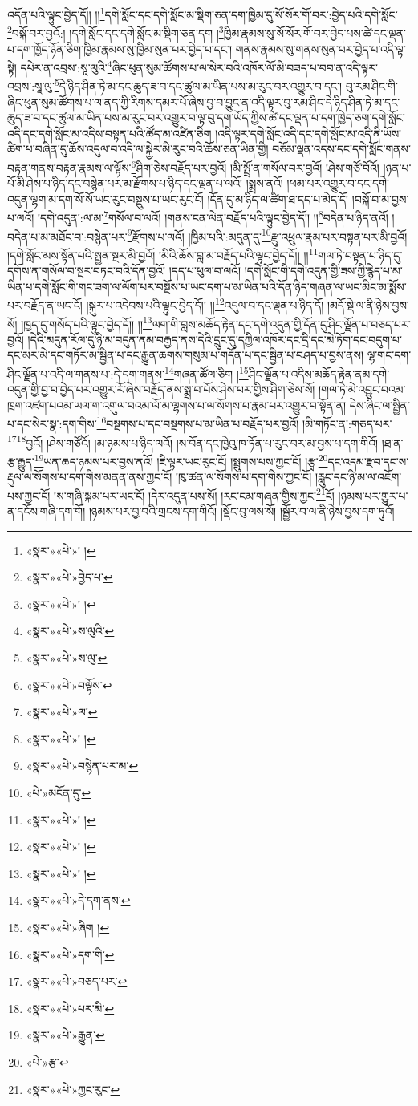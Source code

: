 འདོན་པའི་ལྟུང་བྱེད་དོ།། །།\footnote{«སྣར་»«པེ་»། །}དགེ་སློང་དང་དགེ་སློང་མ་སྡིག་ཅན་དག་ཁྱིམ་དུ་སོ་སོར་གོ་བར་:བྱེད་པའི་དགེ་སློང་\footnote{«སྣར་»«པེ་»བྱེད་པ་}བསྐོ་བར་བྱའོ:། །དགེ་སློང་དང་དགེ་སློང་མ་སྡིག་ཅན་དག །\footnote{«སྣར་»«པེ་»། །}ཁྱིམ་རྣམས་སུ་སོ་སོར་གོ་བར་བྱེད་པས་ཚེ་དང་ལྡན་པ་དག་ཁྱོད་ཉོན་ཅིག་ཁྱིམ་རྣམས་སུ་ཁྱིམ་སུན་པར་བྱེད་པ་དང་། གནས་རྣམས་སུ་གནས་སུན་པར་བྱེད་པ་འདི་ལྟ་སྟེ། དཔེར་ན་འབྲས་:སཱ་ལུའི་\footnote{«སྣར་»«པེ་»ས་ལུའི་}ཞིང་ཕུན་སུམ་ཚོགས་པ་ལ་སེར་བའི་འཁོར་ལོ་མི་བཟད་པ་བབ་ན་འདི་ལྟར་འབྲས་:སཱ་ལུ་\footnote{«སྣར་»«པེ་»ས་ལུ་}དེ་ཉིད་ཤིན་ཏེ་མ་དང་ཆུད་ཟ་བ་དང་ཚུལ་མ་ཡིན་པས་མ་རུང་བར་འགྱུར་བ་དང་། བུ་རམ་ཤིང་གི་ཞིང་ཕུན་སུམ་ཚོགས་པ་ལ་ནད་ཀྱི་རིགས་དམར་པོ་ཞེས་བྱ་བ་བྱུང་ན་འདི་ལྟར་བུ་རམ་ཤིང་དེ་ཉིད་ཤིན་ཏེ་མ་དང་ཆུད་ཟ་བ་དང་ཚུལ་མ་ཡིན་པས་མ་རུང་བར་འགྱུར་བ་ལྟ་བུ་དག་ཡོད་ཀྱིས་ཚེ་དང་ལྡན་པ་དག་ཁྱེད་ཅག་དགེ་སློང་འདི་དང་དགེ་སློང་མ་འདིས་བསྟན་པའི་ཚོད་མ་འཛིན་ཅིག །འདི་ལྟར་དགེ་སློང་འདི་དང་དགེ་སློང་མ་འདི་ནི་ཡོས་ཚིག་པ་བཞིན་དུ་ཆོས་འདུལ་བ་འདི་ལ་སྐྱེར་མི་རུང་བའི་ཆོས་ཅན་ཡིན་གྱི། བཅོམ་ལྡན་འདས་དང་དགེ་སློང་གནས་བརྟན་གནས་བརྟན་རྣམས་ལ་ལྟོས་\footnote{«སྣར་»«པེ་»བལྟོས་}ཤིག་ཅེས་བརྗོད་པར་བྱའོ། །མི་སྤྲོ་ན་གསོལ་བར་བྱའོ། །ཤེས་གཙོ་བོའོ། །ཉན་པ་པོ་མི་ཤེས་པ་ཉིད་དང་བསྙེན་པར་མ་རྫོགས་པ་ཉིད་དང་ལྡན་པ་ལའོ། །སྨྲས་ནའོ། །ཕམ་པར་འགྱུར་བ་དང་དགེ་འདུན་ལྷག་མ་དག་སོ་སོ་ཡང་རུང་བསྡུས་པ་ཡང་རུང་ངོ། །དོན་དུ་མ་ཉིད་ལ་ཚིག་ཐ་དད་པ་མེད་དོ། །བསྐོ་བ་མ་བྱས་པ་ལའོ། །དགེ་འདུན་:ལ་མ་\footnote{«སྣར་»«པེ་»ལ་}གསོལ་བ་ལའོ། །གནས་ངན་ལེན་བརྗོད་པའི་ལྟུང་བྱེད་དོ།། །།\footnote{«སྣར་»«པེ་»། །}བདེན་པ་ཉིད་ནའོ། །བདེན་པ་མ་མཐོང་བ་:བསྙེན་པར་\footnote{«སྣར་»«པེ་»བསྙེན་པར་མ་}རྫོགས་པ་ལའོ། །ཁྱིམ་པའི་:མདུན་དུ་\footnote{«པེ་»མངོན་དུ་}རྫུ་འཕྲུལ་རྣམ་པར་བསྟན་པར་མི་བྱའོ། །དགེ་སློང་མས་སྟོན་པའི་སྤྱན་སྔར་མི་བྱའོ། །མིའི་ཆོས་བླ་མ་བརྗོད་པའི་ལྟུང་བྱེད་དོ།། །།\footnote{«སྣར་»«པེ་»། །}གལ་ཏེ་བསྟན་པ་ཉིད་དུ་དགོས་ན་གསོལ་བ་སྔར་བཏང་བའི་དོན་བྱའོ། །དད་པ་ཕུལ་བ་ལའོ། །དགེ་སློང་གི་དགེ་འདུན་གྱི་ཟས་ཀྱི་རྙེད་པ་མ་ཡིན་པ་དགེ་སློང་གི་གང་ཟག་ལ་ལོག་པར་བསྔོས་པ་ཡང་དག་པ་མ་ཡིན་པའི་དོན་ཉིད་གཞན་ལ་ཡང་མིང་མ་སྨོས་པར་བརྗོད་ན་ཡང་ངོ། །སྐུར་པ་འདེབས་པའི་ལྟུང་བྱེད་དོ།། །།\footnote{«སྣར་»«པེ་»། །}འདུལ་བ་དང་ལྡན་པ་ཉིད་དོ། །མདོ་སྡེ་ལ་ནི་ཉེས་བྱས་སོ། །ཁྱད་དུ་གསོད་པའི་ལྟུང་བྱེད་དོ།། །།\footnote{«སྣར་»«པེ་»། །}ལག་གི་བླས་མཆོད་རྟེན་དང་དགེ་འདུན་གྱི་དོན་དུ་ཤིང་ལྗོན་པ་བཅད་པར་བྱའོ། །དེའི་མདུན་རོལ་དུ་ཉི་མ་བདུན་ནམ་བརྒྱད་ནས་དེའི་དྲུང་དུ་དཀྱིལ་འཁོར་དང་དྲི་དང་མེ་ཏོག་དང་བདུག་པ་དང་མར་མེ་དང་གཏོར་མ་སྦྱིན་པ་དང་རྒྱུན་ཆགས་གསུམ་པ་གདོན་པ་དང་སྦྱིན་པ་བཤད་པ་བྱས་ནས། ལྷ་གང་དག་ཤིང་ལྗོན་པ་འདི་ལ་གནས་པ་:དེ་དག་གནས་\footnote{«སྣར་»«པེ་»དེ་དག་ནས་}གཞན་ཚོལ་ཅིག །\footnote{«སྣར་»«པེ་»ཞིག །}ཤིང་ལྗོན་པ་འདིས་མཆོད་རྟེན་ནམ་དགེ་འདུན་གྱི་བྱ་བ་བྱེད་པར་འགྱུར་རོ་ཞེས་བརྗོད་ནས་སྨྲ་བ་པོས་ཤེས་པར་གྱིས་ཤིག་ཅེས་སོ། །གལ་ཏེ་མེ་འབྱུང་བའམ་ཁྲག་འཛག་པའམ་ཡལ་ག་འགུལ་བའམ་ལོ་མ་ལྷགས་པ་ལ་སོགས་པ་རྣམ་པར་འགྱུར་བ་སྟོན་ན། དེས་ཞིང་ལ་སྦྱིན་པ་དང་སེར་སྣ་:དག་གིས་\footnote{«སྣར་»«པེ་»དག་གི་}བསྔགས་པ་དང་བསྔགས་པ་མ་ཡིན་པ་བརྗོད་པར་བྱའོ། །མི་གཏོང་ན་:གཅད་པར་\footnote{«སྣར་»«པེ་»བཅད་པར་}\footnote{«སྣར་»«པེ་»པར་མི་}བྱའོ། །ཤེས་གཙོའོ། །མ་ཉམས་པ་ཉིད་ལའོ། །ས་བོན་དང་ཁྱེའུ་ཁ་ཏོན་པ་རུང་བར་མ་བྱས་པ་དག་གིའོ། །ཐ་ན་རྩ་རྒྱུད་\footnote{«སྣར་»«པེ་»རྒྱུན་}ཡན་ཆད་ཉམས་པར་བྱས་ནའོ། །ཇི་ལྟར་ཡང་རུང་ངོ། །སྤྲུགས་པས་ཀྱང་ངོ། །རྩྭ་\footnote{«པེ་»རྩ་}དང་འདམ་རྫབ་དང་ས་རྡུལ་ལ་སོགས་པ་དག་གིས་མནན་ནས་ཀྱང་ངོ། །ཁུ་ཚན་ལ་སོགས་པ་དག་གིས་ཀྱང་ངོ། །རླུང་དང་ཉི་མ་ལ་འཇོག་པས་ཀྱང་ངོ། །ས་གཞི་སྐམ་པར་ཡང་ངོ། །དེར་འདུན་པས་སོ། །རང་ངམ་གཞན་གྱིས་ཀྱང་\footnote{«སྣར་»«པེ་»ཀྱང་རུང་}ངོ། །ཉམས་པར་གྱུར་པ་ན་དངོས་གཞི་དག་གོ། །ཉམས་པར་བྱ་བའི་གྲངས་དག་གིའོ། །སྡོང་བུ་ལས་སོ། །སྦྱོར་བ་ལ་ནི་ཉེས་བྱས་དག་ཏུའོ། 